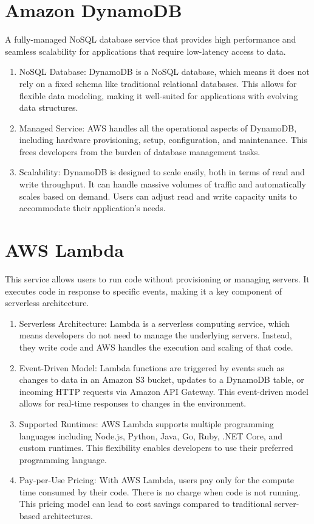 \documentclass[11pt,a4paper,oneside]{report}
\begin{document}
\section{Amazon DynamoDB}

A fully-managed NoSQL database service that provides high performance and seamless scalability for applications that require low-latency access to data.
\begin{enumerate}
  \item NoSQL Database: DynamoDB is a NoSQL database, which means it does not rely on a fixed schema like traditional relational databases. This allows for flexible data modeling, making it well-suited for applications with evolving data structures.
  \item Managed Service: AWS handles all the operational aspects of DynamoDB, including hardware provisioning, setup, configuration, and maintenance. This frees developers from the burden of database management tasks.
  \item Scalability: DynamoDB is designed to scale easily, both in terms of read and write throughput. It can handle massive volumes of traffic and automatically scales based on demand. Users can adjust read and write capacity units to accommodate their application's needs. \cite{awsddb}
\end{enumerate}

\section{AWS Lambda}

This service allows users to run code without provisioning or managing servers. It executes code in response to specific events, making it a key component of serverless architecture.
\begin{enumerate}
  \item Serverless Architecture: Lambda is a serverless computing service, which means developers do not need to manage the underlying servers. Instead, they write code and AWS handles the execution and scaling of that code.
  \item Event-Driven Model: Lambda functions are triggered by events such as changes to data in an Amazon S3 bucket, updates to a DynamoDB table, or incoming HTTP requests via Amazon API Gateway. This event-driven model allows for real-time responses to changes in the environment.
  \item Supported Runtimes: AWS Lambda supports multiple programming languages including Node.js, Python, Java, Go, Ruby, .NET Core, and custom runtimes.
        This flexibility enables developers to use their preferred programming language.
  \item Pay-per-Use Pricing: With AWS Lambda, users pay only for the compute time consumed by their code. There is no charge when code is not running. This pricing model can lead to cost savings compared to traditional server-based architectures. \cite{awslambda}
\end{enumerate}
\end{document}
